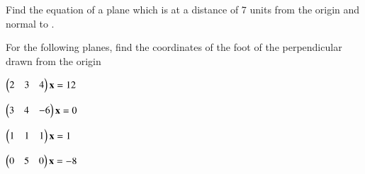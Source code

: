 \item Find the equation of a plane which is at a distance of 7 units from the origin and normal to .
%
\item  For the following planes, find the coordinates of the foot of the perpendicular drawn from the origin
\begin{enumerate}[itemsep=2pt]
\begin{multicols}{2}
\item
$
\begin{pmatrix}2 & 3 & 4\end{pmatrix}\mathbf{x}=12
$
\item
$
\begin{pmatrix}3 & 4 & -6\end{pmatrix}\mathbf{x}=0
$
\item
$
\begin{pmatrix}1 & 1 & 1\end{pmatrix}\mathbf{x}=1
$
\item
$
\begin{pmatrix}0 & 5 &0\end{pmatrix}\mathbf{x}=-8
$
\end{multicols}
\end{enumerate}

